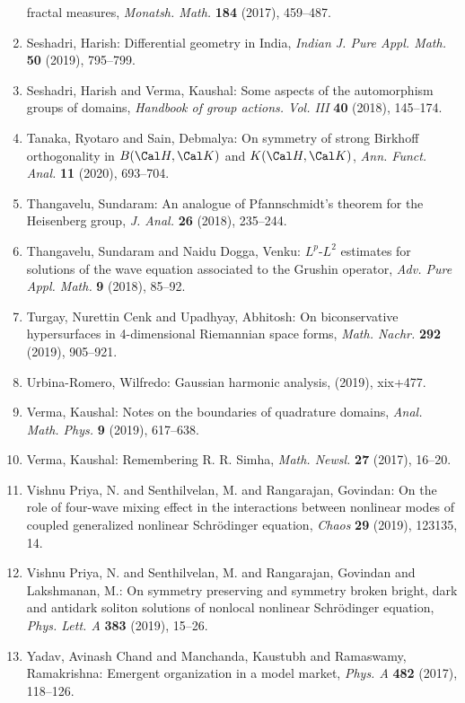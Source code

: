 \begin{enumerate}
fractal measures, \emph{Monatsh. Math.} {\bf 184} (2017), 459--487.
\item Seshadri, Harish: Differential geometry in {I}ndia, \emph{Indian J. Pure Appl. Math.} {\bf 50} (2019), 795--799.
\item Seshadri, Harish and Verma, Kaushal: Some aspects of the automorphism groups of domains, \emph{Handbook of group actions. {V}ol. {III}} {\bf 40} (2018), 145--174.
\item Tanaka, Ryotaro and Sain, Debmalya: On symmetry of strong {B}irkhoff orthogonality in {$B(\Cal
H,\Cal K)$} and {$K(\Cal H,\Cal K)$}, \emph{Ann. Funct. Anal.} {\bf 11} (2020), 693--704.
\item Thangavelu, Sundaram: An analogue of {P}fannschmidt's theorem for the {H}eisenberg
group, \emph{J. Anal.} {\bf 26} (2018), 235--244.
\item Thangavelu, Sundaram and Naidu Dogga, Venku: {$L^p$}-{$L^2$} estimates for solutions of the wave equation
associated to the {G}rushin operator, \emph{Adv. Pure Appl. Math.} {\bf 9} (2018), 85--92.
\item Turgay, Nurettin Cenk and Upadhyay, Abhitosh: On biconservative hypersurfaces in 4-dimensional {R}iemannian
space forms, \emph{Math. Nachr.} {\bf 292} (2019), 905--921.
\item Urbina-Romero, Wilfredo: Gaussian harmonic analysis, \emph{} {\bf } (2019), xix+477.
\item Verma, Kaushal: Notes on the boundaries of quadrature domains, \emph{Anal. Math. Phys.} {\bf 9} (2019), 617--638.
\item Verma, Kaushal: Remembering {R}. {R}. {S}imha, \emph{Math. Newsl.} {\bf 27} (2017), 16--20.
\item Vishnu Priya, N. and Senthilvelan, M. and Rangarajan,
Govindan: On the role of four-wave mixing effect in the interactions
between nonlinear modes of coupled generalized nonlinear
{S}chr\"{o}dinger equation, \emph{Chaos} {\bf 29} (2019), 123135, 14.
\item Vishnu Priya, N. and Senthilvelan, M. and Rangarajan, Govindan
and Lakshmanan, M.: On symmetry preserving and symmetry broken bright, dark and
antidark soliton solutions of nonlocal nonlinear {S}chr\"{o}dinger
equation, \emph{Phys. Lett. A} {\bf 383} (2019), 15--26.
\item Yadav, Avinash Chand and Manchanda, Kaustubh and Ramaswamy,
Ramakrishna: Emergent organization in a model market, \emph{Phys. A} {\bf 482} (2017), 118--126.
\end{enumerate}

